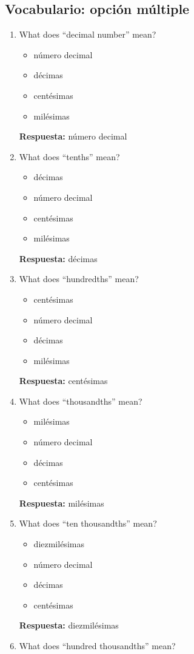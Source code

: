 \documentclass[11pt,a4paper]{article}
\begin{document}
\subsection{Vocabulario: opci\'on m\'ultiple}
\begin{enumerate}
\item What does ``decimal number'' mean?
\begin{itemize}
\item número decimal
\item décimas
\item centésimas
\item milésimas
\end{itemize}
\textbf{Respuesta:} número decimal
\item What does ``tenths'' mean?
\begin{itemize}
\item décimas
\item número decimal
\item centésimas
\item milésimas
\end{itemize}
\textbf{Respuesta:} décimas
\item What does ``hundredths'' mean?
\begin{itemize}
\item centésimas
\item número decimal
\item décimas
\item milésimas
\end{itemize}
\textbf{Respuesta:} centésimas
\item What does ``thousandths'' mean?
\begin{itemize}
\item milésimas
\item número decimal
\item décimas
\item centésimas
\end{itemize}
\textbf{Respuesta:} milésimas
\item What does ``ten thousandths'' mean?
\begin{itemize}
\item diezmilésimas
\item número decimal
\item décimas
\item centésimas
\end{itemize}
\textbf{Respuesta:} diezmilésimas
\item What does ``hundred thousandths'' mean?
\begin{itemize}

\end{itemize}
\end{enumerate}
\end{document}
